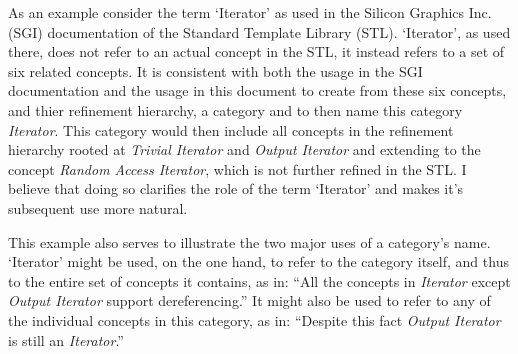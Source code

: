 \documentclass{article}
\begin{document}
As an example consider the term `Iterator' as used in the Silicon Graphics Inc.
(SGI) documentation of the Standard Template Library (STL). `Iterator', as used there, does
not refer to an actual concept in the STL, it instead refers to a set of six related concepts.
It is consistent with both the usage in the SGI documentation and the usage in this document to create
from these six concepts, and thier refinement hierarchy, a category and to then name this category
\emph{Iterator}. This category would then include all concepts in 
the refinement hierarchy rooted at \emph{Trivial Iterator} and \emph{Output Iterator} and extending to
the concept \emph{Random Access Iterator}, which is not further refined in the STL. I believe that doing
so clarifies the role of the term `Iterator' and makes it's subsequent use more natural.

This example also serves to
illustrate the two major uses of a category's name. `Iterator' might be used, on the one hand,
to refer to the category itself, and thus to the entire set of concepts it contains, as in:
``All the concepts in \emph{Iterator} except \emph{Output Iterator} support dereferencing.''
It might also be used to refer to any of the individual concepts in this category, as in:
``Despite this fact \emph{Output Iterator} is still an \emph{Iterator}.''
\end{document}
